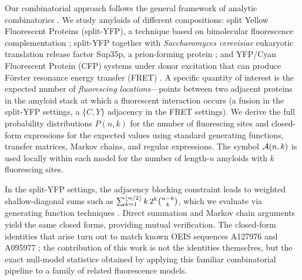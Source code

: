 \documentclass[referee,lineno,pdflatex,sn-mathphys-ay]{sn-jnl}
\DeclarePairedDelimiter\floor{\lfloor}{\rfloor}
\newcommand{\cA}{ {\cal A} }
\begin{document}
Our combinatorial approach follows the general framework of analytic combinatorics \citep[Ch.~I]{flajolet2009}. We study amyloids of different compositions: split Yellow Fluorescent Proteins (split-YFP), a technique based on bimolecular fluorescence complementation \citep{hu2002,kerppola2006}; split-YFP together with \textit{Saccharomyces cerevisiae} eukaryotic translation release factor Sup35p, a prion-forming protein \citep{patino1996}; and YFP/Cyan Fluorescent Protein (CFP) systems under donor excitation that can produce F\"{o}rster resonance energy transfer (FRET) \citep{forster1948,patterson2000}. A specific quantity of interest is the expected number of \textit{fluorescing locations}---points between two adjacent proteins in the amyloid stack at which a fluorescent interaction occurs (a fusion in the split-YFP settings, a $\{C, Y\}$ adjacency in the FRET settings). We derive the full probability distributions $P(n,k)$ for the number of fluorescing sites and closed-form expressions for the expected values using standard generating functions, transfer matrices, Markov chains, and regular expressions. The symbol $\cA(n,k)$ is used locally within each model for the number of length-$n$ amyloids with $k$ fluorescing sites.

In the split-YFP settings, the adjacency blocking constraint leads to weighted shallow-diagonal sums such as $\sum_{k=1}^{\floor{n/2}} k\, 2^k \binom{n-k}{k}$, which we evaluate via generating function techniques \citep{wilf2006}. Direct summation and Markov chain arguments yield the same closed forms, providing mutual verification. The closed-form identities that arise turn out to match known OEIS sequences A127976 and A095977 \citep{oeisA127976,oeisA095977}; the contribution of this work is not the identities themselves, but the exact null-model statistics obtained by applying this familiar combinatorial pipeline to a family of related fluorescence models.
\end{document}
